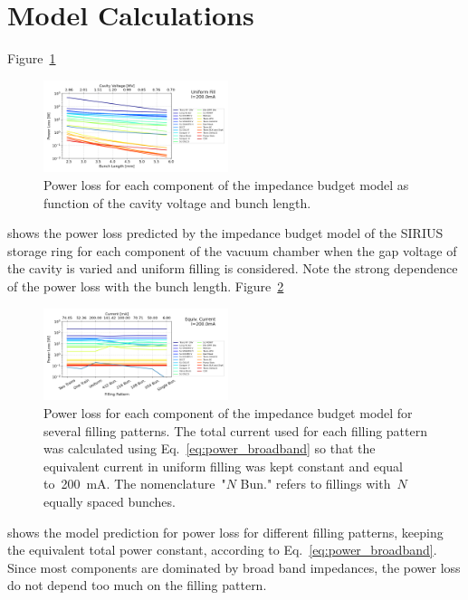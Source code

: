 \documentclass
[
    a4paper,
    biblatex,     %
]{jacow}
\begin{document}
\section{Model Calculations}

    Figure~\ref{fig:model_vary_vgap}
    \begin{figure}
        \centering
        \includegraphics[width=0.48\textwidth]{vary_vgap_uniform_fill_curr200p00mA.png}
        \caption{Power loss for each component of the impedance budget model as function of the cavity voltage and bunch length.}
        \label{fig:model_vary_vgap}
    \end{figure}
     shows the power loss predicted by the impedance budget model of the SIRIUS storage ring for each component of the vacuum chamber when the gap voltage of the cavity is varied and uniform filling is considered. Note the strong dependence of the power loss with the bunch length. Figure~\ref{fig:model_vary_fillp}
    \begin{figure}
        \centering
        \includegraphics[width=0.48\textwidth]{vary_fillp_equivcurr200p00mA.png}
        \caption{Power loss for each component of the impedance budget model for several filling patterns. The total current used for each filling pattern was calculated using Eq.~\eqref{eq:power_broadband} so that the equivalent current in uniform filling was kept constant and equal to~\SI{200}{\milli\ampere}. The nomenclature~"$\!N$ Bun." refers to fillings with~$N$ equally spaced bunches.}
        \label{fig:model_vary_fillp}
    \end{figure}
     shows the model prediction for power loss for different filling patterns, keeping the equivalent total power constant, according to Eq.~\eqref{eq:power_broadband}. Since most components are dominated by broad band impedances, the power loss do not depend too much on the filling pattern.
    
\end{document}
